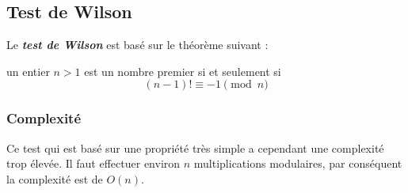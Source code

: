 \subsection{Test de Wilson}
	Le \textit{\textbf{test de Wilson}} est basé sur le théorème suivant :
		
		\vspace{-1.5em}\begin{adjustwidth}{1.5cm}{1.5cm} 
		\begin{Th}
			un entier $n > 1$ est un nombre premier si et seulement si
			\[(n-1)! \equiv -1 \pmod n\]
		\end{Th}
		\end{adjustwidth}\vspace{0.5em}
		
		
		
		\subsubsection*{Complexité}
			Ce test qui est basé sur une propriété très simple a cependant une complexité trop élevée. Il faut effectuer environ $n$ multiplications modulaires, par conséquent la complexité est de $O(n)$.
